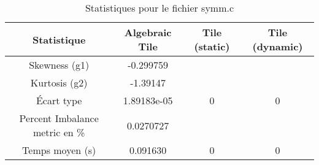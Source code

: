\documentclass{article}
\begin{document}
\begin{table}[htbp]
  \centering
  \caption{Statistiques pour le fichier symm.c}
  \begin{tabular}{|c|c|c|c|}
    \hline
    Statistique & Algebraic Tile & Tile (static) & Tile (dynamic) \\ 
    \hline
    Skewness (g1) & -0.299759 &  &  \\ 
    Kurtosis (g2) & -1.39147 &  &  \\ 
    Écart type & 1.89183e-05 & 0 & 0\\ 
    Percent Imbalance metric en \% & 0.0270727 &  & \\ 
    Temps moyen (s) & 0.091630 & 0 & 0 \\ 
    \hline
  \end{tabular}
\end{table}
\newpage
\end{document}
